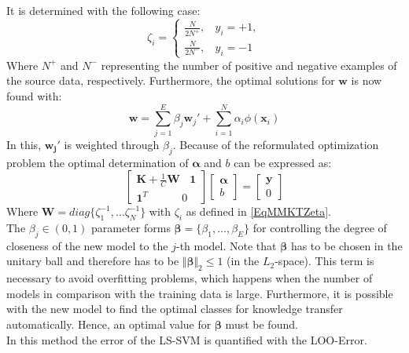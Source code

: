 It is determined with the following case:\cite{Tommasi.}
\begin{equation}\label{EqMMKTZeta}
	\zeta_i = \begin{cases}
			\frac{N}{2N^+}, \>\>\>\> y_i = +1,\\
			\frac{N}{2N^-}, \>\>\>\> y_i = -1
	\end{cases}
\end{equation} 
Where $N^+$ and $N^-$ representing the number of positive and negative examples of the source data, respectively.
Furthermore, the optimal solutions for $\mathbf{w}$ is now found with:\cite{Tommasi.}
\begin{equation}
	\mathbf{w} = \sum_{j=1}^{E}\beta_j\mathbf{w}_j'+\sum_{i=1}^{N}\alpha_i\phi(\mathbf{x}_i)
\end{equation}
In this, $\mathbf{w_j}'$ is weighted through $\beta_j$.
Because of the reformulated optimization problem the optimal determination of $\boldsymbol{\alpha}$ and $b$ can be expressed as:\cite{Tommasi.}
\begin{equation}\label{EqMMKTParaEst}
\begin{bmatrix}
\mathbf{K}+\frac{1}{C}\mathbf{W} \>\>\>\> \mathbf{1}\\
\mathbf{1}^T \>\>\>\>\>\>\>\>\>\>\>\>\>\> 0
\end{bmatrix}
\begin{bmatrix}
\boldsymbol{\alpha}\\
b
\end{bmatrix}
= 
\begin{bmatrix}
\mathbf{y} \\
0
\end{bmatrix}
\end{equation}
Where $\mathbf{W} = diag\{\zeta_1^{-1},\dots\zeta_N^{-1}\}$ with $\zeta_i$ as defined in \eqref{EqMMKTZeta}.\\
The $\beta_j \in (0,1)$ parameter forms $\boldsymbol{\beta} = \{\beta_1,\dots,\beta_E \}$ for controlling the degree of closeness of the new model to the $j$-th model.
Note that $\boldsymbol{\beta}$ has to be chosen in the unitary ball and therefore has to be $\Vert\boldsymbol{\beta}\Vert_2\le 1$ (in the $L_2$-space).
This term is necessary to avoid overfitting problems, which happens when the number of models in comparison with the training data is large.
Furthermore, it is possible with the new model to find the optimal classes for knowledge transfer automatically.
Hence, an optimal value for $\boldsymbol{\beta}$ must be found.\cite{Tommasi.}\\
In this method the error of the \acs{LS-SVM} is quantified with the \ac{LOO}-Error.\cite{Tommasi.}\\
